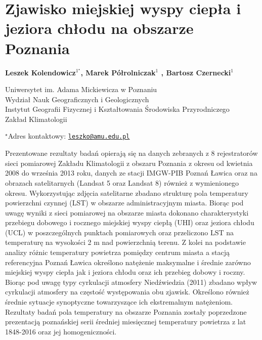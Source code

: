 \documentclass[\main/boa.tex]{subfiles}
\begin{document}
\section{Zjawisko miejskiej wyspy ciepła i jeziora chłodu na obszarze Poznania}

\begin{center}
  {\bf {} Leszek Kolendowicz$^{1^\star}$,  Marek Półrolniczak$^{1}$ ,  Bartosz Czernecki$^{1}$ }
\end{center}

\vskip 0.3cm

\begin{affiliations}
\begin{enumerate}
\begin{minipage}{0.915\textwidth}
\centering
\item Uniwersytet im. Adama Mickiewicza w Poznaniu \\ Wydział Nauk Geograficznych i Geologicznych  \\ Instytut Geografii Fizycznej i Kształtowania Środowiska Przyrodniczego\\
Zakład Klimatologii \\[-2pt]
\end{minipage}
\end{enumerate}
$^\star$Adres kontaktowy: \href{mailto:leszko@amu.edu.pl}{\nolinkurl{leszko@amu.edu.pl}}\\
\end{affiliations}

\vskip 0.5cm


\vskip 0.5cm

Prezentowane rezultaty badań opierają się na danych zebranych z 8 rejestratorów sieci pomiarowej Zakładu Klimatologii z obszaru Poznania z okresu od kwietnia 2008 do września 2013 roku, danych ze stacji IMGW-PIB Poznań Ławica oraz na obrazach satelitarnych (Landsat 5 oraz Landsat 8) również z wymienionego okresu. Wykorzystując zdjęcia satelitarne zbadano strukturę pola temperatury powierzchni czynnej (LST) w obszarze administracyjnym miasta. Biorąc pod uwagę wyniki z sieci pomiarowej na obszarze miasta dokonano charakterystyki przebiegu dobowego i rocznego miejskiej wyspy ciepłą (UHI) oraz jeziora chłodu (UCL) w poszczególnych punktach pomiarowych oraz przeliczono LST na temperaturę na wysokości 2 m nad powierzchnią terenu. Z kolei na podstawie analizy różnic temperatury powietrza pomiędzy centrum miasta a stacją referencyjna Poznań Ławica określono natężenie maksymalne i średnie zarówno miejskiej wyspy ciepła jak i jeziora chłodu oraz ich przebieg dobowy i roczny. Biorąc pod uwagę typy cyrkulacji atmosfery Niedźwiedzia (2011) zbadano wpływ cyrkulacji atmosfery na częstość występowania obu zjawisk. Określono również średnie sytuacje synoptyczne towarzyszące ich ekstremalnym natężeniom. Rezultaty badań pola temperatury na obszarze Poznania zostały poprzedzone prezentacją poznańskiej serii średniej miesięcznej temperatury powietrza z lat 1848-2016 oraz jej homogeniczności. 
\end{document}
